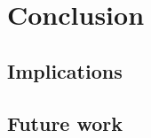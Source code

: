 \documentclass[../thesis.tex]{subfiles}
\begin{document}
\chapter{Conclusion}

\section{Implications}

\section{Future work}
\end{document}

